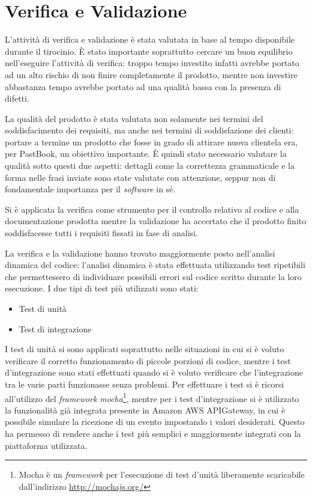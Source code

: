 
\chapter{Verifica e Validazione}

L'attività di verifica e validazione è stata valutata in base al tempo
disponibile durante il tirocinio. È stato importante soprattutto cercare un
buon equilibrio nell'eseguire l'attività di verifica: troppo tempo investito
infatti avrebbe portato ad un alto rischio di non finire completamente il
prodotto, mentre non investire abbastanza tempo avrebbe portato ad una qualità
bassa con la presenza di difetti.

La qualità del prodotto è stata valutata non solamente nei termini del
soddisfacimento dei requisiti, ma anche nei termini di soddisfazione dei
clienti: portare a termine un prodotto che fosse in grado di attirare nuova
clientela era, per PastBook, un obiettivo importante. È quindi stato necessario
valutare la qualità sotto questi due aspetti: dettagli come la correttezza
grammaticale e la forma nelle frasi inviate sono state valutate con attenzione,
seppur non di fondamentale importanza per il \textit{software} in sé.

Si è applicata la verifica come strumento per il controllo relativo
al codice e alla documentazione prodotta mentre la validazione ha accertato
che il prodotto finito soddisfacesse tutti i requisiti fissati in fase di
analisi.

La verifica e la validazione hanno trovato maggiormente posto nell'analisi
dinamica del codice: l'analisi dinamica è stata effettuata utilizzando test
ripetibili che permettessero di individuare possibili errori sul codice
scritto durante la loro esecuzione.
I due tipi di test più utilizzati sono stati:
\begin{itemize}
  \item Test di unità
  \item Test di integrazione
\end{itemize}
I test di unità si sono applicati soprattutto nelle situazioni in cui si è
voluto verificare il corretto funzionamento di piccole porzioni di codice,
mentre i test d'integrazione sono stati effettuati quando si è voluto
verificare che l'integrazione tra le varie parti funzionasse senza problemi.
Per effettuare i test si è ricorsi all'utilizzo del \textit{framework}
\textit{mocha}\footnote{Mocha è un \textit{framework} per l'esecuzione di test
d'unità liberamente scaricabile dall'indirizzo \url{http://mochajs.org/}},
mentre per i test d'integrazione si è utilizzato la funzionalità già integrata
presente in Amazon AWS APIGateway, in cui è possibile simulare la ricezione di
un evento impostando i valori desiderati. Questo ha permesso di rendere anche i
test più semplici e maggiormente integrati con la piattaforma utilizzata.

